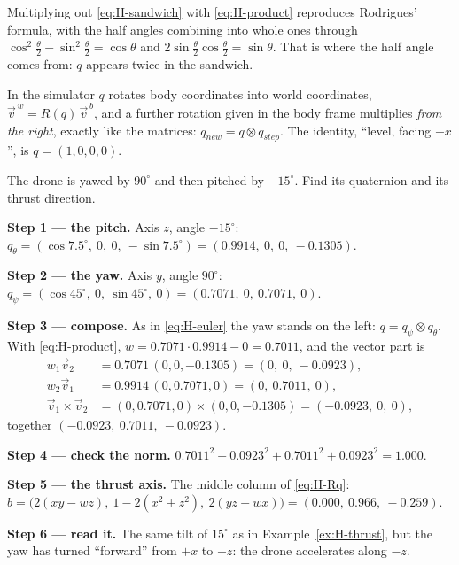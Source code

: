 Multiplying out \cref{eq:H-sandwich} with \cref{eq:H-product} reproduces Rodrigues' formula, with the half angles combining into whole ones through $\cos^2\tfrac\theta2 - \sin^2\tfrac\theta2 = \cos\theta$ and $2\sin\tfrac\theta2\cos\tfrac\theta2 = \sin\theta$. That is where the half angle comes from: $q$ appears twice in the sandwich.

In the simulator $q$ rotates body coordinates into world coordinates, $\vec v^{\,w} = R(q)\,\vec v^{\,b}$, and a further rotation given in the body frame multiplies \emph{from the right}, exactly like the matrices: $q_{new} = q \otimes q_{step}$. The identity, \enquote{level, facing $+x$}, is $q = (1, 0, 0, 0)$.

\begin{example}
\label{ex:H-build}
The drone is yawed by $90^\circ$ and then pitched by $-15^\circ$. Find its quaternion and its thrust direction.

\textbf{Step 1 — the pitch.} Axis $z$, angle $-15^\circ$: $q_\theta = (\cos 7.5^\circ,\ 0,\ 0,\ -\sin 7.5^\circ) = (0.9914,\ 0,\ 0,\ -0.1305)$.

\textbf{Step 2 — the yaw.} Axis $y$, angle $90^\circ$: $q_\psi = (\cos 45^\circ,\ 0,\ \sin 45^\circ,\ 0) = (0.7071,\ 0,\ 0.7071,\ 0)$.

\textbf{Step 3 — compose.} As in \cref{eq:H-euler} the yaw stands on the left: $q = q_\psi \otimes q_\theta$. With \cref{eq:H-product}, $w = 0.7071 \cdot 0.9914 - 0 = 0.7011$, and the vector part is
\begin{align*}
  w_1\vec v_2 &= 0.7071\,(0, 0, -0.1305) = (0,\ 0,\ -0.0923),\\
  w_2\vec v_1 &= 0.9914\,(0, 0.7071, 0) = (0,\ 0.7011,\ 0),\\
  \vec v_1 \times \vec v_2 &= (0, 0.7071, 0) \times (0, 0, -0.1305) = (-0.0923,\ 0,\ 0),
\end{align*}
together $(-0.0923,\ 0.7011,\ -0.0923)$.

\textbf{Step 4 — check the norm.} $0.7011^2 + 0.0923^2 + 0.7011^2 + 0.0923^2 = 1.000$.

\textbf{Step 5 — the thrust axis.} The middle column of \cref{eq:H-Rq}: $\hat b = \big(2(xy - wz),\ 1 - 2(x^2 + z^2),\ 2(yz + wx)\big) = (0.000,\ 0.966,\ -0.259)$.

\textbf{Step 6 — read it.} The same tilt of $15^\circ$ as in Example~\ref{ex:H-thrust}, but the yaw has turned \enquote{forward} from $+x$ to $-z$: the drone accelerates along $-z$.
\end{example}

